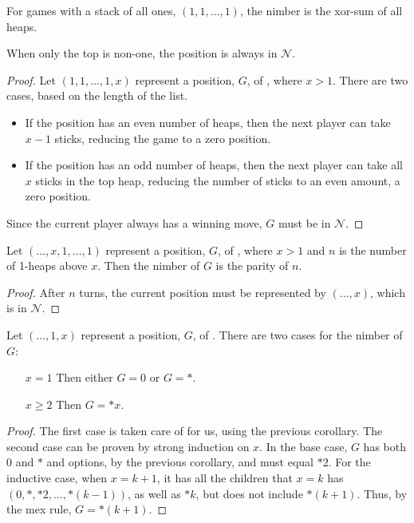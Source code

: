 \documentclass[letter,10pt]{article}
\newcommand{\fuzzy}{\ensuremath{\mathcal{N}}}
\begin{document}
\begin{observation}
\label{obs:stackAllOnes}
 	For games with a stack of all ones, $(1, 1, \ldots, 1)$, the nimber is the xor-sum of all heaps.
\end{observation}

\begin{lemma}
\label{lem:towerNimBigTop}
	When only the top is non-one, the position is always in \fuzzy.
\end{lemma}
\begin{proof}
	Let $(1, 1, \ldots, 1, x)$ represent a position, $G$, of , where $x > 1$.  There are two cases, based on the length of the list.
	\begin{itemize}
		\item If the position has an even number of heaps, then the next player can take $x-1$ sticks, reducing the game to a zero position.
		\item If the position has an odd number of heaps, then the next player can take all $x$ sticks in the top heap, reducing the number of sticks to an even amount, a zero position.
	\end{itemize}
	Since the current player always has a winning move, $G$ must be in \fuzzy.
\end{proof}

\begin{corollary}
\label{corol:towerOnesOnTop}
	Let $(\ldots, x, 1, \ldots, 1)$ represent a position, $G$, of , where $x > 1$ and $n$ is the number of 1-heaps above $x$.  Then the nimber of $G$ is the parity of $n$.
\end{corollary}
\begin{proof}
	After $n$ turns, the current position must be represented by $(\ldots, x)$, which is in \fuzzy.  
\end{proof}

\begin{lemma}
	Let $(\ldots, 1, x)$ represent a position, $G$, of .  There are two cases for the nimber of $G$:
	\begin{itemize}
		\item[$x = 1$] Then either $G = 0$ or $G = *$.
		\item[$x \geq 2$] Then $G = *x$.
	\end{itemize}
\end{lemma}
\begin{proof}
	The first case is taken care of for us, using the previous corollary.
	The second case can be proven by strong induction on $x$.  In the base case, $G$ has both $0$ and $*$ and options, by the previous corollary, and must equal $*2$.  For the inductive case, when $x = k+1$, it has all the children that $x = k$ has $(0, *, *2, \ldots, *(k-1))$, as well as $*k$, but does not include $*(k+1)$.  Thus, by the mex rule, $G = *(k+1)$.
\end{proof}
\end{document}
